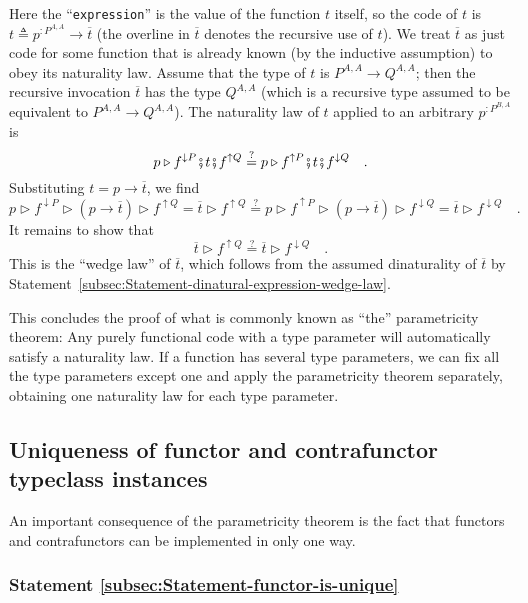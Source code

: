 Here the \textsf{``}\lstinline!expression!\textsf{''} is the value of the function
$t$ itself, so the code of $t$ is $t\triangleq p^{:P^{A,A}}\rightarrow\overline{t}$
(the overline in $\overline{t}$ denotes the recursive use of $t$).
We treat $\overline{t}$ as just code for some function that is already
known (by the inductive assumption) to obey its naturality law. Assume
that the type of $t$ is $P^{A,A}\rightarrow Q^{A,A}$; then the recursive
invocation $\overline{t}$ has the type $Q^{A,A}$ (which is a recursive
type assumed to be equivalent to $P^{A,A}\rightarrow Q^{A,A}$). The
naturality law of $t$ applied to an arbitrary $p^{:P^{B,A}}$ is
\[
p\triangleright f^{\downarrow P}\bef t\bef f^{\uparrow Q}\overset{?}{=}p\triangleright f^{\uparrow P}\bef t\bef f^{\downarrow Q}\quad.
\]
Substituting $t=p\rightarrow\overline{t}$, we find
\[
p\triangleright f^{\downarrow P}\triangleright(p\rightarrow\overline{t})\triangleright f^{\uparrow Q}=\overline{t}\triangleright f^{\uparrow Q}\overset{?}{=}p\triangleright f^{\uparrow P}\triangleright(p\rightarrow\overline{t})\triangleright f^{\downarrow Q}=\overline{t}\triangleright f^{\downarrow Q}\quad.
\]
It remains to show that 
\[
\overline{t}\triangleright f^{\uparrow Q}\overset{?}{=}\overline{t}\triangleright f^{\downarrow Q}\quad.
\]
This is the \textsf{``}wedge law\textsf{''} of $\overline{t}$, which follows from
the assumed dinaturality of $\overline{t}$ by Statement~\ref{subsec:Statement-dinatural-expression-wedge-law}.

This concludes the proof of what is commonly known as \textsf{``}the\textsf{''} parametricity
theorem: Any purely functional code with a type parameter will automatically
satisfy a naturality law. If a function has several type parameters,
we can fix all the type parameters except one and apply the parametricity
theorem separately, obtaining one naturality law for each type parameter.

\subsection{Uniqueness of functor and contrafunctor typeclass instances\label{sec:Uniqueness-of-functor-and-contrafunctor}}

An important consequence of the parametricity theorem is the fact
that functors and contrafunctors can be implemented in only one way.

\subsubsection{Statement \label{subsec:Statement-functor-is-unique}\ref{subsec:Statement-functor-is-unique}}

